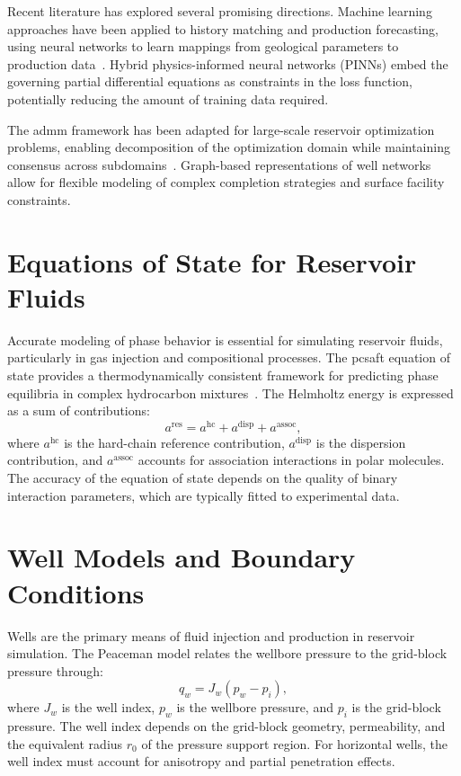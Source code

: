 Recent literature has explored several promising directions. Machine learning approaches have been applied to history matching and production forecasting, using neural networks to learn mappings from geological parameters to production data~\cite{ramalhoFluentPython2015}. Hybrid physics-informed neural networks (PINNs) embed the governing partial differential equations as constraints in the loss function, potentially reducing the amount of training data required.

The \gls{admm} framework has been adapted for large-scale reservoir optimization problems, enabling decomposition of the optimization domain while maintaining consensus across subdomains~\cite{birdNaturalLanguageProcessing2009}. Graph-based representations of well networks allow for flexible modeling of complex completion strategies and surface facility constraints.

\section{Equations of State for Reservoir Fluids}
\label{sec:background:eos}

Accurate modeling of phase behavior is essential for simulating reservoir fluids, particularly in gas injection and compositional processes. The \gls{pcsaft} equation of state provides a thermodynamically consistent framework for predicting phase equilibria in complex hydrocarbon mixtures~\cite{baehrThermodynamikGrundlagenUnd2016}. The Helmholtz energy is expressed as a sum of contributions:
\begin{equation}
    a^{\text{res}} = a^{\text{hc}} + a^{\text{disp}} + a^{\text{assoc}},
    \label{eq:pcsaft}
\end{equation}
where $a^{\text{hc}}$ is the hard-chain reference contribution, $a^{\text{disp}}$ is the dispersion contribution, and $a^{\text{assoc}}$ accounts for association interactions in polar molecules. The accuracy of the equation of state depends on the quality of binary interaction parameters, which are typically fitted to experimental data.

\section{Well Models and Boundary Conditions}
\label{sec:background:wells}

Wells are the primary means of fluid injection and production in reservoir simulation. The Peaceman model relates the wellbore pressure to the grid-block pressure through:
\begin{equation}
    q_w = J_w \left( p_w - p_i \right),
    \label{eq:peaceman}
\end{equation}
where $J_w$ is the well index, $p_w$ is the wellbore pressure, and $p_i$ is the grid-block pressure. The well index depends on the grid-block geometry, permeability, and the equivalent radius $r_0$ of the pressure support region. For horizontal wells, the well index must account for anisotropy and partial penetration effects.

